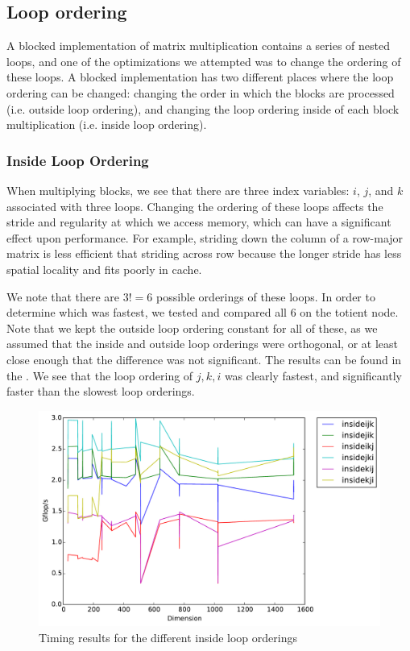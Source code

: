 \subsection{Loop ordering}\label{sec:loopordering}
A blocked implementation of matrix multiplication contains a series of nested
loops, and one of the optimizations we attempted was to change the ordering of
these loops. A blocked implementation has two different places where the loop
ordering can be changed: changing the order in which the blocks are processed
(i.e. outside loop ordering), and changing the loop ordering inside of each
block multiplication (i.e. inside loop ordering).

\subsubsection{Inside Loop Ordering}
When multiplying blocks, we see that there are three index variables: $i$, $j$,
and $k$ associated with three loops. Changing the ordering of these loops
affects the stride and regularity at which we access memory, which can have a
significant effect upon performance. For example, striding down the column of a
row-major matrix is less efficient that striding across row because the longer
stride has less spatial locality and fits poorly in cache.

We note that there are $3! = 6$ possible orderings of these loops. In order to
determine which was fastest, we tested and compared all 6 on the totient node.
Note that we kept the outside loop ordering constant for all of these, as we
assumed that the inside and outside loop orderings were orthogonal, or at least
close enough that the difference was not significant. The results can be found
in the . We see that the loop ordering of $j,k,i$ was
clearly fastest, and significantly faster than the slowest loop orderings.

\begin{figure}[hh]
  \centering
  \includegraphics[width=\textwidth]{timing_insideloops.pdf}
  \caption{Timing results for the different inside loop orderings}
  \label{fig:insideloop}
\end{figure}

